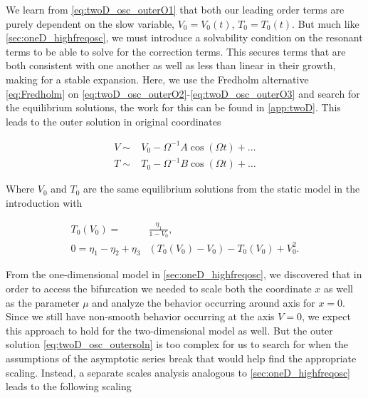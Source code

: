 We learn from \eqref{eq:twoD_osc_outerO1} that both our leading order terms are purely dependent on the slow variable, $V_0=V_0(t)$, $T_0=T_0(t)$. But much like \autoref{sec:oneD_highfreqosc}, we must introduce a solvability condition on the resonant terms to be able to solve for the correction terms. This secures terms that are both consistent with one another as well as less than linear in their growth, making for a stable expansion. Here, we use the Fredholm alternative \eqref{eq:Fredholm} on \eqref{eq:twoD_osc_outerO2}-\eqref{eq:twoD_osc_outerO3} and search for the equilibrium solutions, the work for this can be found in \autoref{app:twoD}. This leads to the outer solution in original coordinates

\begin{equation}\label{eq:twoD_osc_outersoln}
\begin{aligned}
V\sim& V_0-\Omega^{-1} A\cos(\Omega t)+\dots\\
T\sim& T_0-\Omega^{-1} B\cos(\Omega t)+\ldots%
\end{aligned}
\end{equation}

Where $V_0$ and $T_0$ are the same equilibrium solutions from the static model in the introduction with

\begin{equation*} \label{eq:twoD_lowerleadingorder}
\begin{aligned}
T_0(V_0)=&\frac{\eta_1}{1-V_0},\\
0=\eta_1-\eta_2+\eta_3&(T_0(V_0)-V_0)-T_0(V_0)+V_0^2.
\end{aligned}
\end{equation*}

From the one-dimensional model in \autoref{sec:oneD_highfreqosc}, we discovered that in order to access the bifurcation we needed to scale both the coordinate $x$ as well as the parameter $\mu$ and analyze the behavior occurring around axis for $x=0$. Since we still have non-smooth behavior occurring at the axis $V=0$, we expect this approach to hold for the two-dimensional model as well. But the outer solution \eqref{eq:twoD_osc_outersoln} is too complex for us to search for when the assumptions of the asymptotic series break that would help find the appropriate scaling. Instead, a separate scales analysis analogous to  \autoref{sec:oneD_highfreqosc} leads to the following scaling

